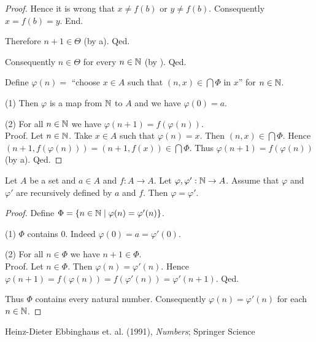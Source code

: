 \documentclass{article}
\begin{document}
\begin{forthel}
\begin{proof}
            Hence it is wrong that $x \neq f(b)$ or $y \neq f(b)$.
            Consequently $x = f(b) = y$.
          End.

          Therefore $n + 1 \in \Theta$ (by a).
        Qed.

        Consequently $n \in \Theta$ for every $n \in \mathbb{N}$ (by ).
      Qed.

      Define $\varphi(n) =$ ``choose $x \in A$ such that $(n, x) \in
      \bigcap \Phi$ in $x$'' for $n \in \mathbb{N}$.

      (1) Then $\varphi$ is a map from $\mathbb{N}$ to $A$ and we have
      $\varphi(0) = a$.

      (2) For all $n \in \mathbb{N}$ we have $\varphi(n + 1) =
      f(\varphi(n))$. \\
      Proof.
        Let $n \in \mathbb{N}$.
        Take $x \in A$ such that $\varphi(n) = x$.
        Then $(n, x) \in \bigcap \Phi$.
        Hence $(n + 1, f(\varphi(n))) = (n + 1, f(x)) \in \bigcap \Phi$.
        Thus $\varphi(n + 1) = f(\varphi(n))$ (by a).
      Qed.
    \end{proof}
  \end{forthel}

  \begin{forthel}
    \begin{theorem*}\label{dedekind_uniqueness}
      Let $A$ be a set and $a \in A$ and $f : A \to A$.
      Let $\varphi, \varphi' : \mathbb{N} \to A$.
      Assume that $\varphi$ and $\varphi'$ are recursively defined by $a$ and
      $f$.
      Then $\varphi = \varphi'$.
    \end{theorem*}
    \begin{proof}
      Define $\Phi = \{ n \in \mathbb{N} \mid \varphi(n) = \varphi'(n) \}$.

      (1) $\Phi$ contains $0$.
      Indeed $\varphi(0) = a = \varphi'(0)$.

      (2) For all $n \in \Phi$ we have $n + 1 \in \Phi$. \\
      Proof.
        Let $n \in \Phi$.
        Then $\varphi(n) = \varphi'(n)$.
        Hence $\varphi(n + 1)
          = f(\varphi(n))
          = f(\varphi'(n))
          = \varphi'(n + 1)$.
      Qed.

      Thus $\Phi$ contains every natural number.
      Consequently $\varphi(n) = \varphi'(n)$ for each $n \in \mathbb{N}$.
    \end{proof}
  \end{forthel}

  \begin{thebibliography}{1}
     Heinz-Dieter Ebbinghaus et. al. (1991),
      \textit{Numbers};
      Springer Science
  \end{thebibliography}
\end{document}
